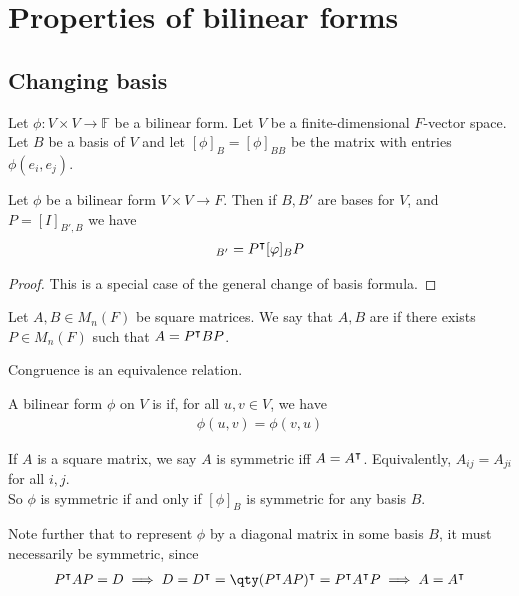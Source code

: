\section{Properties of bilinear forms}

\subsection{Changing basis}
Let $\phi \colon V \times V \to \mathbb F$ be a bilinear form.
Let $V$ be a finite-dimensional $F$-vector space.
Let $B$ be a basis of $V$ and let $[\phi]_B = [\phi]_{BB}$ be the matrix with entries $\phi(e_i, e_j)$.
\begin{lemma}
	Let $\phi$ be a bilinear form $V \times V \to F$.
	Then if $B, B'$ are bases for $V$, and $P = [I]_{B', B}$ we have
	\begin{align*}
		[\phi]_{B'} = P^\transpose [\phi]_B P
	\end{align*}
\end{lemma}

\begin{proof}
	This is a special case of the general change of basis formula.
\end{proof}

\begin{definition}[Congruence]
	Let $A, B \in M_n(F)$ be square matrices.
	We say that $A, B$ are  if there exists $P \in M_n(F)$ such that $A = P^\intercal B P$.
\end{definition}

\begin{remark}
	Congruence is an equivalence relation.
\end{remark}

\begin{definition}[Symmetric]
	A bilinear form $\phi$ on $V$ is  if, for all $u, v \in V$, we have
	\begin{align*}
		\phi(u,v) = \phi(v,u)
	\end{align*}
\end{definition}

\begin{remark}
	If $A$ is a square matrix, we say $A$ is symmetric iff $A = A^\intercal$.
	Equivalently, $A_{ij} = A_{ji}$ for all $i, j$. \\
	So $\phi$ is symmetric if and only if $[\phi]_B$ is symmetric for any basis $B$.

	Note further that to represent $\phi$ by a diagonal matrix in some basis $B$, it must necessarily be symmetric, since
	\begin{align*}
		P^\transpose A P = D \implies D = D^\transpose = \qty(P^\transpose A P)^\transpose = P^\transpose A^\transpose P \implies A = A^\transpose
	\end{align*}
\end{remark}

